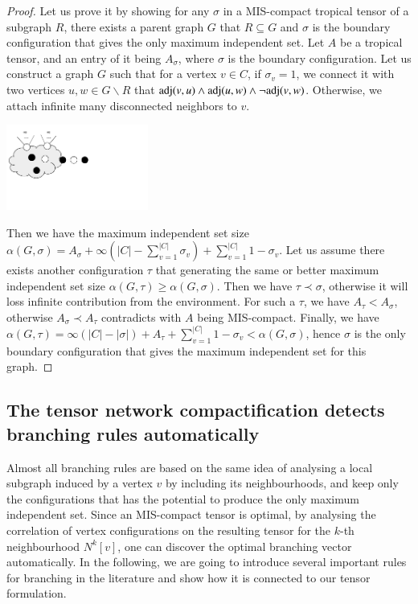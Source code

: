 \documentclass[review,onefignum,onetabnum]{siamart190516}
\newcommand{\<}{\langle}
\renewcommand{\>}{\rangle}
\begin{document}
\begin{proof}
    Let us prove it by showing for any $\sigma$ in a MIS-compact tropical tensor of a subgraph $R$, there exists a parent graph $G$ that $R\subseteq G$ and $\sigma$ is the boundary configuration that gives the only maximum independent set.
    Let $A$ be a tropical tensor, and an entry of it being $A_{\sigma}$, where $\sigma$ is the boundary configuration.
    Let us construct a graph $G$ such that for a vertex $v \in C$, if $\sigma_v=1$, we connect it with two vertices $u, w \in G \backslash R$ that ${\rm adj}(v, u) \land {\rm adj}(u, w) \land \neg{\rm adj}(v, w)$. Otherwise, we attach infinite many disconnected neighbors to $v$.

    \centerline{\includegraphics[width=0.35\textwidth, trim={0cm 2cm 5cm 0cm}, clip]{proofoptimal.pdf}}
    Then we have the maximum independent set size $\alpha(G,\sigma) = A_{\sigma} + \infty (|C|-\sum_{v=1}^{|C|}\sigma_v) + \sum_{v=1}^{|C|} 1-\sigma_v$.
    Let us assume there exists another configuration $\tau$ that generating the same or better maximum independent set size $\alpha(G, \tau) \geq \alpha(G, \sigma)$.
    Then we have $\tau \prec \sigma$, otherwise it will loss infinite contribution from the environment.
    For such a $\tau$, we have $A_\tau < A_\sigma$, otherwise $A_\sigma \prec A_\tau$ contradicts with $A$ being MIS-compact.
    Finally, we have $\alpha(G,\tau) = \infty (|C|-|\sigma|) + A_{\tau} + \sum_{v=1}^{|C|} 1-\sigma_v < \alpha(G,\sigma)$, hence $\sigma$ is the only boundary configuration that gives the maximum independent set for this graph.
\end{proof}

\subsection{The tensor network compactification detects branching rules automatically}
Almost all branching rules are based on the same idea of analysing a local subgraph induced by a vertex $v$
by including its neighbourhoods,
and keep only the configurations that has the potential to produce the only maximum independent set.
Since an MIS-compact tensor is optimal, by analysing the correlation of vertex configurations on the resulting tensor for the $k$-th neighbourhood $N^k[v]$, one can discover the optimal branching vector automatically.
In the following, we are going to introduce several important rules for branching in the literature and show how it is connected to our tensor formulation.
\end{document}
